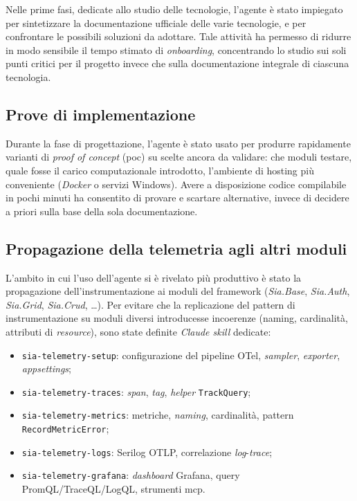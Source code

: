 Nelle prime fasi, dedicate allo studio delle tecnologie, l'agente è stato impiegato
per sintetizzare la documentazione ufficiale delle varie tecnologie, e per confrontare le possibili
soluzioni da adottare. Tale attività ha permesso di ridurre in modo sensibile il tempo stimato di 
\emph{onboarding}, concentrando lo studio sui soli punti
critici per il progetto invece che sulla documentazione integrale di ciascuna tecnologia.

\subsection{Prove di implementazione}

Durante la fase di progettazione, l'agente è stato usato per produrre rapidamente varianti di
\emph{proof of concept} (\gls{poc}) su scelte ancora da validare: che moduli testare, quale fosse 
il carico computazionale introdotto, l'ambiente di hosting più conveniente (\emph{Docker} o servizi Windows).
Avere a disposizione codice compilabile in pochi minuti ha consentito di provare e
scartare alternative, invece di decidere a priori sulla base della sola documentazione.

\subsection{Propagazione della telemetria agli altri moduli}

L'ambito in cui l'uso dell'agente si è rivelato più produttivo è stato la propagazione
dell'instrumentazione ai moduli del framework (\emph{Sia.Base}, \emph{Sia.Auth},
\emph{Sia.Grid}, \emph{Sia.Crud}, \ldots). Per evitare che la replicazione del pattern di
instrumentazione su moduli diversi introducesse incoerenze (naming, cardinalità, attributi
di \emph{resource}), sono state definite \emph{Claude skill} dedicate:

\begin{itemize}
    \item \texttt{sia-telemetry-setup}: configurazione del pipeline OTel, \emph{sampler},
        \emph{exporter}, \emph{appsettings};
    \item \texttt{sia-telemetry-traces}: \emph{span}, \emph{tag}, \emph{helper} \texttt{TrackQuery};
    \item \texttt{sia-telemetry-metrics}: metriche, \emph{naming}, cardinalità, pattern
        \texttt{RecordMetricError};
    \item \texttt{sia-telemetry-logs}: Serilog OTLP, correlazione \emph{log}-\emph{trace};
    \item \texttt{sia-telemetry-grafana}: \emph{dashboard} Grafana, query PromQL/TraceQL/LogQL,
        strumenti \gls{mcp}.
\end{itemize}

